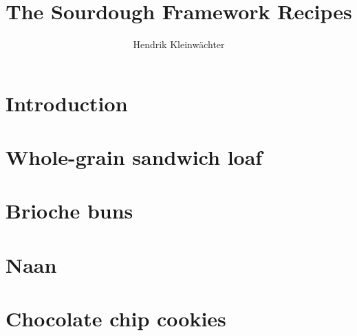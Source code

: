 \documentclass[paper=a4, twoside=false, fontsize=12pt, parskip=half,
                bibliography=totoc, listof=totoc]{scrbook}
\author{Hendrik Kleinwächter}
\title{The Sourdough Framework Recipes}
\begin{document}

\titlepage

\frontmatter
{%
\hypersetup{hidelinks}
\ifdefined\HCode\else\tableofcontents\fi
}



\mainmatter

\chapter{Introduction}%


\chapter{Whole-grain sandwich loaf}%


\chapter{Brioche buns}%


\chapter{Naan}%


\chapter{Chocolate chip cookies}%

\end{document}
